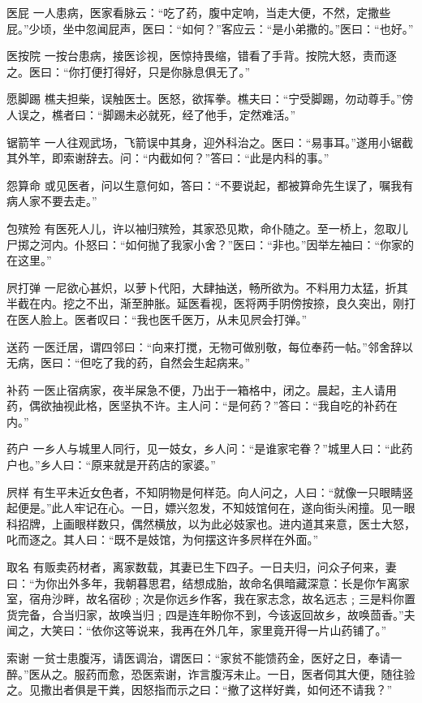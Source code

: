 \documentclass[12pt,UTF8]{ctexbook}
\begin{document}
医屁
一人患病，医家看脉云：“吃了药，腹中定响，当走大便，不然，定撒些屁。”少顷，坐中忽闻屁声，医曰：“如何？”客应云：“是小弟撒的。”医曰：“也好。”

医按院
一按台患病，接医诊视，医惊持畏缩，错看了手背。按院大怒，责而逐之。医曰：“你打便打得好，只是你脉息俱无了。”

愿脚踢
樵夫担柴，误触医士。医怒，欲挥拳。樵夫曰：“宁受脚踢，勿动尊手。”傍人误之，樵者曰：“脚踢未必就死，经了他手，定然难活。”

锯箭竿
一人往观武场，飞箭误中其身，迎外科治之。医曰：“易事耳。”遂用小锯截其外竿，即索谢辞去。问：“内截如何？”答曰：“此是内科的事。”

怨算命
或见医者，问以生意何如，答曰：“不要说起，都被算命先生误了，嘱我有病人家不要去走。”

包殡殓
有医死人儿，许以袖归殡殓，其家恐见欺，命仆随之。至一桥上，忽取儿尸掷之河内。仆怒曰：“如何抛了我家小舍？”医曰：“非也。”因举左袖曰：“你家的在这里。”

屄打弹
一尼欲心甚炽，以萝卜代阳，大肆抽送，畅所欲为。不料用力太猛，折其半截在内。挖之不出，渐至肿胀。延医看视，医将两手阴傍按捺，良久突出，刚打在医人脸上。医者叹曰：“我也医千医万，从未见屄会打弹。”

送药
一医迁居，谓四邻曰：“向来打搅，无物可做别敬，每位奉药一帖。”邻舍辞以无病，医曰：“但吃了我的药，自然会生起病来。”

补药
一医止宿病家，夜半屎急不便，乃出于一箱格中，闭之。晨起，主人请用药，偶欲抽视此格，医坚执不许。主人问：“是何药？”答曰：“我自吃的补药在内。”

药户
一乡人与城里人同行，见一妓女，乡人问：“是谁家宅眷？”城里人曰：“此药户也。”乡人曰：“原来就是开药店的家婆。”

屄样
有生平未近女色者，不知阴物是何样范。向人问之，人曰：“就像一只眼睛竖起便是。”此人牢记在心。一日，嫖兴忽发，不知妓馆何在，遂向街头闲撞。见一眼科招牌，上画眼样数只，偶然横放，以为此必妓家也。进内道其来意，医士大怒，叱而逐之。其人曰：“既不是妓馆，为何摆这许多屄样在外面。”

取名
有贩卖药材者，离家数载，其妻已生下四子。一日夫归，问众子何来，妻曰：“为你出外多年，我朝暮思君，结想成胎，故命名俱暗藏深意：长是你乍离家室，宿舟沙畔，故名宿砂﹔次是你远乡作客，我在家志念，故名远志﹔三是料你置货完备，合当归家，故唤当归﹔四是连年盼你不到，今该返回故乡，故唤茴香。”夫闻之，大笑曰：“依你这等说来，我再在外几年，家里竟开得一片山药铺了。”

索谢
一贫士患腹泻，请医调治，谓医曰：“家贫不能馈药金，医好之日，奉请一醉。”医从之。服药而愈，恐医索谢，诈言腹泻未止。一日，医者伺其大便，随往验之。见撒出者俱是干粪，因怒指而示之曰：“撤了这样好粪，如何还不请我？”
\end{document}
